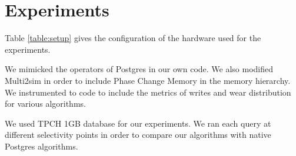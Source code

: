 \chapter{Experiments}
\label{exp}

Table \ref{table:setup} gives the configuration of the hardware used for the experiments.

We mimicked the operators of Postgres in our own code. We also modified Multi2sim \cite{multi2sim} in order to include Phase Change Memory in the memory hierarchy. We instrumented to code to include the metrics of writes and wear distribution for various algorithms.

We used TPCH 1GB database for our experiments. We ran each query at different selectivity points in order to compare our algorithms with native Postgres algorithms. 

